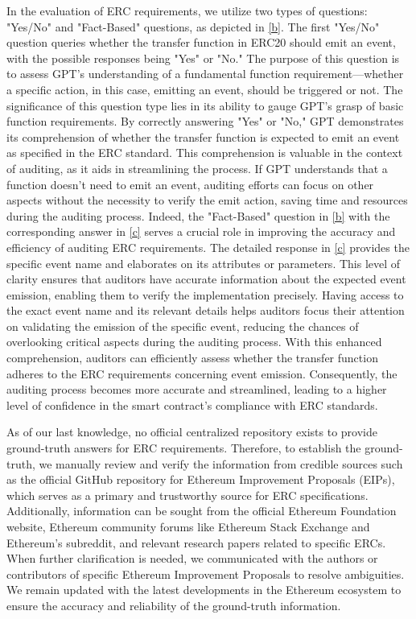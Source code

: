 In the evaluation of ERC requirements, we utilize two types of questions: "Yes/No" and "Fact-Based" questions, as depicted in \ref{b}. 
The first "Yes/No" question queries whether the transfer function in ERC20 should emit an event, with the possible responses being "Yes" or "No." 
The purpose of this question is to assess GPT's understanding of a fundamental function requirement—whether a specific action, 
in this case, emitting an event, should be triggered or not. 
The significance of this question type lies in its ability to gauge GPT's grasp of basic function requirements. 
By correctly answering "Yes" or "No," GPT demonstrates its comprehension of whether the transfer function is expected to emit an event as specified in the ERC standard. 
This comprehension is valuable in the context of auditing, as it aids in streamlining the process. 
If GPT understands that a function doesn't need to emit an event, auditing efforts can focus on other aspects without the necessity to verify the emit action, 
saving time and resources during the auditing process. 
Indeed, the "Fact-Based" question in \ref{b} with the corresponding answer in \ref{c} serves a crucial role in improving the accuracy and efficiency of auditing ERC requirements. 
The detailed response in \ref{c} provides the specific event name and elaborates on its attributes or parameters. 
This level of clarity ensures that auditors have accurate information about the expected event emission, enabling them to verify the implementation precisely. 
Having access to the exact event name and its relevant details helps auditors focus their attention on validating the emission of the specific event, 
reducing the chances of overlooking critical aspects during the auditing process. 
With this enhanced comprehension, auditors can efficiently assess whether the transfer function adheres to the ERC requirements concerning event emission. 
Consequently, the auditing process becomes more accurate and streamlined, leading to a higher level of confidence in the smart contract's compliance with ERC standards.

As of our last knowledge, no official centralized repository exists to provide ground-truth answers for ERC requirements. 
Therefore, to establish the ground-truth, we manually review and verify the information from credible sources 
such as the official GitHub repository for Ethereum Improvement Proposals (EIPs), 
which serves as a primary and trustworthy source for ERC specifications. 
Additionally, information can be sought from the official Ethereum Foundation website, Ethereum community forums like Ethereum Stack Exchange and Ethereum's subreddit, 
and relevant research papers related to specific ERCs. When further clarification is needed, 
we communicated with the authors or contributors of specific Ethereum Improvement Proposals to resolve ambiguities. 
We remain updated with the latest developments in the Ethereum ecosystem to ensure the accuracy and reliability of the ground-truth information. 


